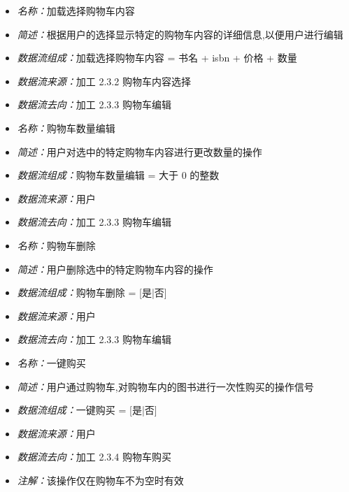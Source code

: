 \documentclass{article}
\begin{document}
\begin{CJK*}{UTF8}{gbsn}
\vspace{-1mm}

\begin{itemize}
	\item \textit{名称：}加载选择购物车内容
	\item \textit{简述：}根据用户的选择显示特定的购物车内容的详细信息,以便用户进行编辑
	\item \textit{数据流组成：}加载选择购物车内容 = 书名 + isbn + 价格 + 数量
	\item \textit{数据流来源：}加工 2.3.2 购物车内容选择
	\item \textit{数据流去向：}加工 2.3.3 购物车编辑
\end{itemize}

\vspace{-1mm}

\begin{itemize}
	\item \textit{名称：}购物车数量编辑
	\item \textit{简述：}用户对选中的特定购物车内容进行更改数量的操作
	\item \textit{数据流组成：}购物车数量编辑 = 大于 0 的整数
	\item \textit{数据流来源：}用户
	\item \textit{数据流去向：}加工 2.3.3 购物车编辑
\end{itemize}

\vspace{-1mm}

\begin{itemize}
	\item \textit{名称：}购物车删除
	\item \textit{简述：}用户删除选中的特定购物车内容的操作
	\item \textit{数据流组成：}购物车删除 = [是|否]
	\item \textit{数据流来源：}用户
	\item \textit{数据流去向：}加工 2.3.3 购物车编辑
\end{itemize}

\vspace{-1mm}

\begin{itemize}
	\item \textit{名称：}一键购买
	\item \textit{简述：}用户通过购物车,对购物车内的图书进行一次性购买的操作信号
	\item \textit{数据流组成：}一键购买 = [是|否]
	\item \textit{数据流来源：}用户
	\item \textit{数据流去向：}加工 2.3.4 购物车购买
	\item \textit{注解：}该操作仅在购物车不为空时有效
\end{itemize}


\end{CJK*}
\end{document}
